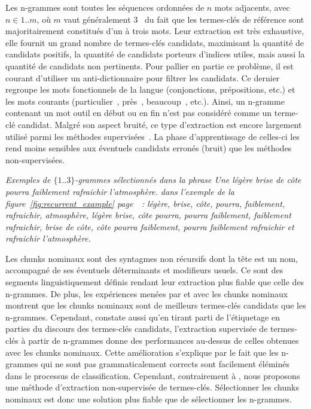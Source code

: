     Les n-grammes sont toutes les séquences ordonnées de $n$ mots adjacents,
    avec $n \in 1..m$, où $m$ vaut généralement
    3~\cite{witten1999kea,turney1999learningalgorithms,hulth2003keywordextraction}
    du fait que les termes-clés de référence sont majoritairement constitués
    d'un à trois mots. Leur extraction est très exhaustive, elle fournit un
    grand nombre de termes-clés candidats, maximisant la quantité de candidats
    positifs, la quantité de candidats porteurs d'indices utiles, mais aussi la
    quantité de candidats non pertinents. Pour pallier en partie ce problème, il
    est courant d'utiliser un anti-dictionnaire pour filtrer les candidats. Ce
    dernier regroupe les mots fonctionnels de la langue (conjonctions,
    prépositions, etc.) et les mots courants (\og particulier~\fg, \og près~\fg,
    \og beaucoup~\fg, etc.). Ainsi, un n-gramme contenant un mot outil en début
    ou en fin n'est pas considéré comme un terme-clé candidat. Malgré son aspect
    bruité, ce type d'extraction est encore largement utilisé parmi les méthodes
    supervisées~\cite{witten1999kea,turney1999learningalgorithms,hulth2003keywordextraction}.
    La phase d'apprentissage de celles-ci les rend moins sensibles aux éventuels
    candidats erronés (bruit) que les méthodes non-supervisées.

    \textit{Exemples de $\{1..3\}$-grammes sélectionnés dans la phrase \og{}Une
    légère brise de côte pourra faiblement rafraichir l'atmosphère.\fg{} dans
    l'exemple de la figure~\ref{fig:recurrent_example}
    page~\pageref{fig:recurrent_example}~: \og{}légère\fg{}, \og{}brise\fg{},
    \og{}côte\fg{}, \og{}pourra\fg{}, \og{}faiblement\fg{},
    \og{}rafraichir\fg{}, \og{}atmosphère\fg{}, \og{}légère brise\fg{},
    \og{}côte pourra\fg{}, \og{}pourra faiblement\fg{}, \og{}faiblement
    rafraichir\fg{}, \og{}brise de côte\fg{}, \og{}côte pourra faiblement\fg{},
    \og{}pourra faiblement rafraichir\fg{} et \og{}rafraichir
    l'atmosphère\fg{}.}

    Les chunks nominaux sont des syntagmes non récursifs dont la tête est un
    nom, accompagné de ses éventuels déterminants et modifieurs usuels. Ce sont
    des segments linguistiquement définis rendant leur extraction plus fiable
    que celle des n-grammes. De plus, les expériences menées par
     et  avec les
    chunks nominaux montrent que les chunks nominaux sont de meilleurs
    termes-clés candidats que les n-grammes. Cependant,
     constate aussi qu'en tirant parti de
    l'étiquetage en parties du discours des termes-clés candidats, l'extraction
    supervisée de termes-clés à partir de n-grammes donne des performances
    au-dessus de celles obtenues avec les chunks nominaux. Cette amélioration
    s'explique par le fait que les n-grammes qui ne sont pas grammaticalement
    corrects sont facilement éléminés dans le processus de classification.
    Cependant, contrairement à , nous
    proposons une méthode d'extraction non-supervisée de termes-clés.
    Sélectionner les chunks nominaux est donc une solution plus fiable que de
    sélectionner les n-grammes.


